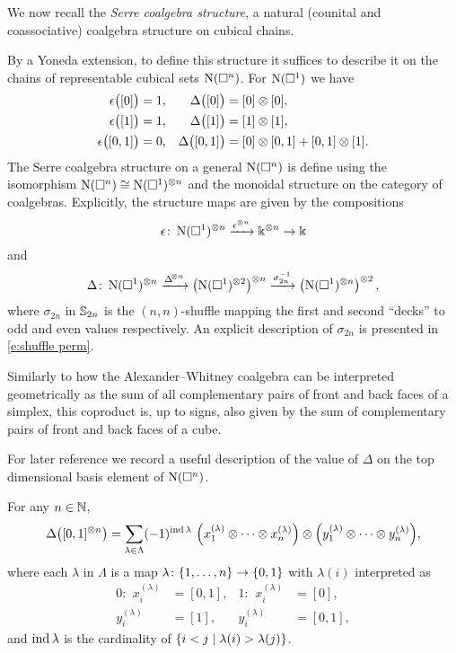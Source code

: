 We now recall the \textit{Serre coalgebra structure}, a natural (counital and coassociative) coalgebra structure on cubical chains.

By a Yoneda extension, to define this structure it suffices to describe it on the chains of representable cubical sets $\operatorname{N}(\square^n)$.
For $\operatorname{N}(\square^1)$ we have
\begin{align*}
	\epsilon \big([0]\big) &= 1,
	& \Delta \big([0]\big) &= [0] \otimes [0], \\
	\epsilon \big([1]\big) &= 1,
	& \Delta \big([1]\big) &= [1] \otimes [1], \\
	\epsilon \big([0,1]\big) &= 0,
	& \Delta \big([0,1]\big) &= [0] \otimes [0,1] + [0,1] \otimes [1].
\end{align*}
The Serre coalgebra structure on a  general $\operatorname{N}(\square^n)$ is define using the isomorphism $\operatorname{N}(\square^n) \cong \operatorname{N}(\square^1)^{\otimes n}$ and the monoidal structure on the category of coalgebras.
Explicitly, the structure maps are given by the compositions
\[
\epsilon \colon \operatorname{N}(\square^1)^{\otimes n} \xrightarrow{\epsilon^{\otimes n}} \Bbbk^{\otimes n} \to \Bbbk
\]
and
\[
\Delta \colon \operatorname{N}(\square^1)^{\otimes n} \xrightarrow{\Delta^{\!\otimes n}} \left( \operatorname{N}(\square^1)^{\otimes 2} \right)^{\otimes n} \xrightarrow{\sigma_{2n}^{-1}} \left( \operatorname{N}(\square^1)^{\otimes n} \right)^{\otimes 2},
\]
where $\sigma_{2n}$ in $\mathbb{S}_{2n}$ is the $(n,n)$-shuffle mapping the first and second ``decks'' to odd and even values respectively.
An explicit description of $\sigma_{2n}$ is presented in \cref{e:shuffle perm}.

\begin{remark*}
	Similarly to how the Alexander--Whitney coalgebra can be interpreted geometrically as the sum of all complementary pairs of front and back faces of a simplex, this coproduct is, up to signs, also given by the sum of complementary pairs of front and back faces of a cube.
\end{remark*}

For later reference we record a useful description of the value of $\Delta$ on the top dimensional basis element of $\operatorname{N}(\square^n)$.

\begin{lemma} \label{l:coproduct description}
	For any $n \in \mathbb{N}$,
	\[
	\Delta \big( [0,1]^{\otimes n} \big) =
	\sum_{\lambda \in \Lambda} (-1)^{\operatorname{ind} \lambda} \
	\Big(x_1^{(\lambda)} \otimes \cdots \otimes x_n^{(\lambda)}\Big) \otimes
	\Big(y_1^{(\lambda)} \otimes \cdots \otimes y_n^{(\lambda)}\Big),
	\]
	where each $\lambda$ in $\Lambda$ is a map $\lambda \colon \{1,\dots,n\} \to \{0, 1\}$ with $\lambda(i)$ interpreted as
	\begin{align*}
		0:\ \, x_i^{(\lambda)} &= [0,1], &	1: \ \, x_i^{(\lambda)} &= [0], \\
		y_i^{(\lambda)} &= [1],   & y_i^{(\lambda)} &= [0,1],
	\end{align*}
	and $\operatorname{ind} \lambda$ is the cardinality of $\{i<j \mid \lambda(i) > \lambda(j)\}$.
\end{lemma}

